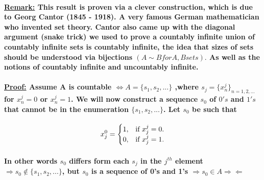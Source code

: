\documentclass[10pt,a4paper]{article}
\begin{document}
\paragraph{\underline{Remark:} This result is proven via a clever construction, which is due to Georg Cantor (1845 - 1918). A very famous German mathematician who invented set theory. Cantor also came up with the diagonal argument (snake trick) we used to prove a countably infinite union of countably infinite sets is countably infinite, the idea that sizes of sets should be understood via bijections $(A \sim B for A,B sets).$ As well as the notions of countably infinite and uncountably infinite.}

\paragraph{\underline{Proof:} Assume A is countable $\iff A = \lbrace s_{1},s_{2},...\rbrace$ ,where $s_{j} = \lbrace x_{n}^{j}\rbrace _{n = 1,2,...}$ for $x_{n}^{j} = 0$ or $x_{n}^{j} = 1$. We will now construct a sequence $s_{0}$ of $0's$ and $1's$ that cannot be in the enumeration $\lbrace s_{1},s_{2},...\rbrace$. Let $s_{0}$ be such that 
}\normalsize
\begin{equation}
 	 x_{j}^{0}=\begin{cases}
    1, & \text{if $x_{j}^{j} = 0$}.\\
    0, & \text{if $ x_{j}^{j} = 1 $}.
  \end{cases}
\end{equation}
\paragraph{In other words $s_{0}$ differs form each $s_{j}$ in the $j^{th}$ element \newline $\Longrightarrow s_{0} \notin \lbrace s_{1}, s_{2},... \rbrace$, but $s_{0}$ is a sequence of 0's and 1's $\Rightarrow s_{0} \in A \Rightarrow\!\Leftarrow$}
\end{document}
